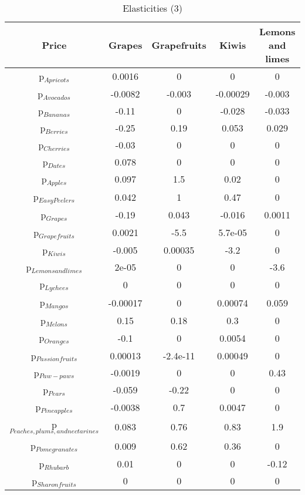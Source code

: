 \documentclass[11pt]{article}
\begin{document}
\begin{table}[h]
\caption{Elasticities (3)}
\label{Table: elasticities 3}
\begin{center}
\begin{tabular}{ccccc}
Price & Grapes & Grapefruits & Kiwis & Lemons and limes \\ \hline
p$_{Apricots}$ & 0.0016 & 0 & 0 & 0 \\ 
p$_{Avocados}$ & -0.0082 & -0.003 & -0.00029 & -0.003 \\ 
p$_{Bananas}$ & -0.11 & 0 & -0.028 & -0.033 \\ 
p$_{Berries}$ & -0.25 & 0.19 & 0.053 & 0.029 \\ 
p$_{Cherries}$ & -0.03 & 0 & 0 & 0 \\ 
p$_{Dates}$ & 0.078 & 0 & 0 & 0 \\ 
p$_{Apples}$ & 0.097 & 1.5 & 0.02 & 0 \\ 
p$_{Easy Peelers}$ & 0.042 & 1 & 0.47 & 0 \\ 
p$_{Grapes}$ & -0.19 & 0.043 & -0.016 & 0.0011 \\ 
p$_{Grapefruits}$ & 0.0021 & -5.5 & 5.7e-05 & 0 \\ 
p$_{Kiwis}$ & -0.005 & 0.00035 & -3.2 & 0 \\ 
p$_{Lemons and limes}$ & 2e-05 & 0 & 0 & -3.6 \\ 
p$_{Lychees}$ & 0 & 0 & 0 & 0 \\ 
p$_{Mangos}$ & -0.00017 & 0 & 0.00074 & 0.059 \\ 
p$_{Melons}$ & 0.15 & 0.18 & 0.3 & 0 \\ 
p$_{Oranges}$ & -0.1 & 0 & 0.0054 & 0 \\ 
p$_{Passion fruits}$ & 0.00013 & -2.4e-11 & 0.00049 & 0 \\ 
p$_{Paw-paws}$ & -0.0019 & 0 & 0 & 0.43 \\ 
p$_{Pears}$ & -0.059 & -0.22 & 0 & 0 \\ 
p$_{Pineapples}$ & -0.0038 & 0.7 & 0.0047 & 0 \\ 
p$_{Peaches, plums, and nectarines}$ & 0.083 & 0.76 & 0.83 & 1.9 \\ 
p$_{Pomegranates}$ & 0.009 & 0.62 & 0.36 & 0 \\ 
p$_{Rhubarb}$ & 0.01 & 0 & 0 & -0.12 \\ 
p$_{Sharon fruits}$ & 0 & 0 & 0 & 0 \\ 
\end{tabular}
\end{center}
\end{table}
\end{document}
